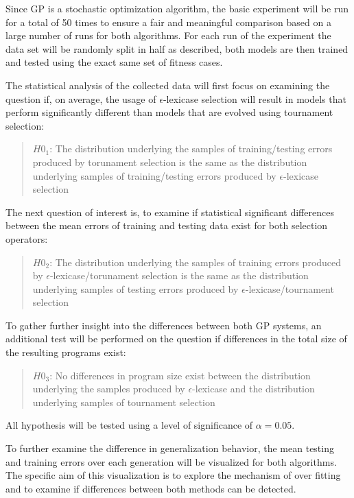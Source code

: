 \documentclass[
  12pt,
]{article}
\begin{document}
Since GP is a stochastic optimization algorithm, the basic experiment
will be run for a total of 50 times to ensure a fair and meaningful
comparison based on a large number of runs for both algorithms. For each
run of the experiment the data set will be randomly split in half as
described, both models are then trained and tested using the exact same
set of fitness cases.

The statistical analysis of the collected data will first focus on
examining the question if, on average, the usage of
\(\epsilon\)-lexicase selection will result in models that perform
significantly different than models that are evolved using tournament
selection:

\begin{quote}
\(H0_{1}\): The distribution underlying the samples of training/testing
errors produced by torunament selection is the same as the distribution
underlying samples of training/testing errors produced by
\(\epsilon\)-lexicase selection
\end{quote}

The next question of interest is, to examine if statistical significant
differences between the mean errors of training and testing data exist
for both selection operators:

\begin{quote}
\(H0_{2}\): The distribution underlying the samples of training errors
produced by \(\epsilon\)-lexicase/torunament selection is the same as
the distribution underlying samples of testing errors produced by
\(\epsilon\)-lexicase/tournament selection
\end{quote}

To gather further insight into the differences between both GP systems,
an additional test will be performed on the question if differences in
the total size of the resulting programs exist:

\begin{quote}
\(H0_{3}\): No differences in program size exist between the
distribution underlying the samples produced by \(\epsilon\)-lexicase
and the distribution underlying samples of tournament selection
\end{quote}

All hypothesis will be tested using a level of significance of
\(\alpha=0.05\).

To further examine the difference in generalization behavior, the mean
testing and training errors over each generation will be visualized for
both algorithms. The specific aim of this visualization is to explore
the mechanism of over fitting and to examine if differences between both
methods can be detected.
\end{document}
